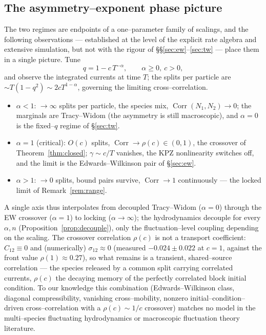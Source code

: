 \documentclass[11pt]{article}
\theoremstyle{plain}
\theoremstyle{definition}
\theoremstyle{remark}
\DeclareMathOperator{\Corr}{Corr}\DeclareMathOperator{\cum}{cum}
\begin{document}
\subsection{The asymmetry--exponent phase picture}\label{sec:phase}

The two regimes are endpoints of a one--parameter family of scalings, and the
following observations --- established at the level of the explicit rate algebra and
extensive simulation, but not with the rigour of \S\S\ref{sec:ew}--\ref{sec:tw} --- place
them in a single picture. Tune
\begin{equation}\label{eq:alpha}
  q=1-c\,T^{-\alpha},\qquad \alpha\ge0,\ c>0,
\end{equation}
and observe the integrated currents at time $T$; the splits per particle are
$\sim T(1-q^2)\sim2cT^{1-\alpha}$, governing the limiting cross--correlation.

\begin{itemize}
\item $\alpha<1$: $\to\infty$ splits per particle, the species mix,
$\Corr(N_1,N_2)\to0$; the marginals are Tracy--Widom (the asymmetry is still
macroscopic), and $\alpha=0$ is the fixed--$q$ regime of \S\ref{sec:tw}.
\item $\alpha=1$ (critical): $O(c)$ splits, $\Corr\to\rho(c)\in(0,1)$, the crossover of
Theorem~\ref{thm:closed}; $\gamma\sim c/T$ vanishes, the KPZ nonlinearity switches off,
and the limit is the Edwards--Wilkinson pair of \S\ref{sec:ew}.
\item $\alpha>1$: $\to0$ splits, bound pairs survive, $\Corr\to1$ continuously --- the
locked limit of Remark~\ref{rem:range}.
\end{itemize}

\noindent A single axis thus interpolates from decoupled Tracy--Widom ($\alpha=0$)
through the EW crossover ($\alpha=1$) to locking ($\alpha\to\infty$); the hydrodynamics
decouple for every $\alpha,n$ (Proposition~\ref{prop:decouple}), only the
fluctuation--level coupling depending on the scaling. The crossover correlation
$\rho(c)$ is not a transport coefficient: $C_{12}\equiv0$ and (numerically)
$\sigma_{12}\approx0$ (measured $-0.024\pm0.022$ at $c=1$, against the front value
$\rho(1)\approx0.27$), so what remains is a transient, shared--source correlation --- the
species released by a common split carrying correlated currents, $\rho(c)$ the decaying
memory of the perfectly correlated block initial condition. To our knowledge this
combination (Edwards--Wilkinson class, diagonal compressibility, vanishing
cross--mobility, nonzero initial--condition--driven cross--correlation with a
$\rho(c)\sim1/c$ crossover) matches no model in the multi--species fluctuating
hydrodynamics or macroscopic fluctuation theory literature.
\end{document}
